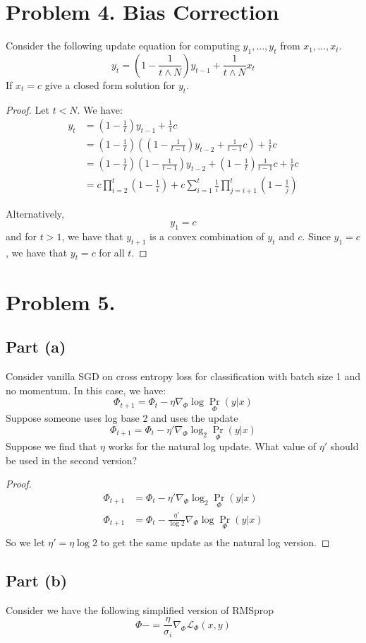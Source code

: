 \documentclass{amsart}
\newcommand{\cL}{\mathcal{L}}
\theoremstyle{definition}
\begin{document}
\section*{Problem 4. Bias Correction}
Consider the following update equation for computing $y_1, \ldots, y_t$ from $x_1, \ldots, x_t$.
\[
y_t = \left(
    1 - \frac1{
        t \land N
    }
\right) y_{t - 1} + \frac1{
    t \land N
} x_t
\]
If $x_t = c$ give a closed form solution for $y_t$. 

\begin{proof}
    Let $t < N$. We have:
    \begin{align*}
        y_{t} &= \left(1 - \frac{1}{t}\right) y_{t - 1} + \frac{1}{t} c \\
        &= \left(1 - \frac{1}{t}\right) \left( \left(1 - \frac{1}{t - 1}\right) y_{t - 2} + \frac{1}{t - 1} c\right) + \frac{1}{t} c \\
        &= \left(1 - \frac{1}{t}\right) \left(1 - \frac{1}{t - 1}\right) y_{t - 2} + \left(1 - \frac{1}{t}\right) \frac{1}{t - 1} c + \frac{1}{t} c \\
        &= c\prod_{i = 2}^{t} \left(1 - \frac1{i}\right) +  c \sum_{i = 1}^t \frac1{i} \prod_{j = i + 1}^t \left(1 - \frac1{j}\right) 
    \end{align*}

    Alternatively, 
    \[
    y_1 = c
    \]
    and for $t > 1$, we have that $y_{t+1}$ is a convex combination of $y_t$ and $c$. Since $y_1 = c$, we have that $y_t = c$ for all $t$.
\end{proof}

\section*{Problem 5.}

\subsection*{Part (a)} Consider vanilla SGD on cross entropy loss for classification with batch size 1 and no momentum. In this case, we have:
\[
\Phi_{t + 1} = \Phi_t - \eta \nabla_{\Phi} \log \Pr_\Phi{(y | x)}
\]
Suppose someone uses log base 2 and uses the update 
\[
\Phi_{t + 1} = \Phi_t - \eta' \nabla_{\Phi} \log_2 \Pr_\Phi{(y | x)}
\]
Suppose we find that $\eta$ works for the natural log update. What value of $\eta'$ should be used in the second version?

\begin{proof}
    \begin{align*}
        \Phi_{t + 1} &= \Phi_t - \eta' \nabla_{\Phi} \log_2 \Pr_\Phi{(y | x)}\\ 
        \Phi_{t + 1} &= \Phi_t - \frac{\eta'}{\log{2}} \nabla_{\Phi} \log \Pr_\Phi{(y | x)}\\ 
    \end{align*}
    So we let $\eta' = \eta \log{2}$ to get the same update as the natural log version.
\end{proof}

\subsection*{Part (b)} Consider we have the following simplified version of RMSprop 
\[
\Phi -= \frac{\eta}{\sigma_i} \nabla_\Phi \cL_\Phi(x, y)
\]
\end{document}
